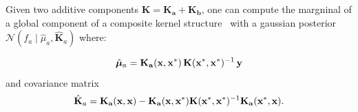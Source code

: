 Given two additive components $\mathbf{K} = \mathbf{K_a} + \mathbf{K_b}$, one can compute the margninal of a global component of a composite kernel structure~\citep{benavoli2015gaussian} with a gaussian posterior $\mathcal{N}(f_a \mid \hat{\mu}_a,\hat{\mathbf{K}}_a)$  where:

\begin{equation}
\label{eq:marginalComponentMean}
\hat{\bm\mu}_a   = \mathbf{K_a}(\mathbf{x},\mathbf{x}^*)\, \mathbf{K}(\mathbf{x}^*,\mathbf{x}^*)^{-1}\, \mathbf{y}
\end{equation}
and covariance matrix
\begin{equation}
\label{eq:marginalComponentCovariance}
\hat{\mathbf{K}}_a =   \mathbf{K_a}(\mathbf{x},\mathbf{x}) -  \mathbf{K_a}(\mathbf{x},\mathbf{x}^*)\mathbf{K}(\mathbf{x}^*,\mathbf{x}^*)^{-1} \mathbf{K_a}(\mathbf{x}^*,\mathbf{x}).
\end{equation}
